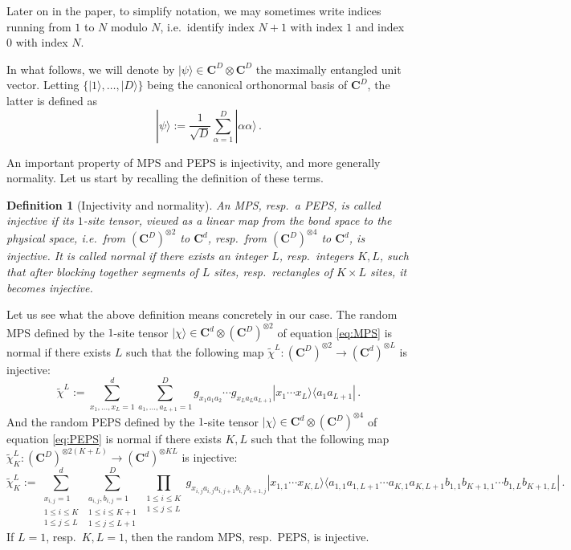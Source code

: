 \documentclass{amsart}
\newtheorem{definition}[theorem]{Definition}
\newcommand{\C}{\mathbf{C}}
\renewcommand{\leq}{\leqslant}
\newcommand{\ketbra}[2]{| #1 \rangle\!\langle #2 |}
\newcommand{\ket}[1]{| #1 \rangle}
\begin{document}
Later on in the paper, to simplify notation, we may sometimes write indices running from $1$ to $N$ modulo $N$, i.e.~identify index $N+1$ with index $1$ and index $0$ with index $N$.

In what follows, we will denote by $\ket{\psi}\in \C^D\otimes\C^D$ the maximally entangled unit vector. Letting $\{ \ket{1},\ldots,\ket{D} \}$ being the canonical orthonormal basis of $\C^D$, the latter is defined as
\[ \ket{\psi} := \frac{1}{\sqrt{D}}\sum_{\alpha=1}^{D} \ket{\alpha\alpha} \, . \]

An important property of MPS and PEPS is injectivity, and more generally normality. Let us start by recalling the definition of these terms.

\begin{definition}[Injectivity and normality]
    An MPS, resp.~a PEPS, is called injective if its $1$-site tensor, viewed as a linear map from the bond space to the physical space, i.e.~from $(\C^D)^{\otimes 2}$ to $\C^d$, resp.~from $(\C^D)^{\otimes 4}$ to $\C^d$, is injective. It is called normal if there exists an integer $L$, resp.~integers $K,L$, such that after blocking together segments of $L$ sites, resp.~rectangles of $K\times L$ sites, it becomes injective.
\end{definition}

Let us see what the above definition means concretely in our case. The random MPS defined by the $1$-site tensor $\ket{\chi}\in\C^d\otimes(\C^D)^{\otimes 2}$ of equation \eqref{eq:MPS} is normal if there exists $L$ such that the following map $\widetilde{\chi}^L:(\C^D)^{\otimes 2}\longrightarrow(\C^d)^{\otimes L}$ is injective:
\[ \widetilde{\chi}^L:= \sum_{x_1,\ldots,x_L=1}^d \sum_{a_1,\ldots,a_{L+1}=1}^D g_{x_1a_1a_2}\cdots g_{x_La_La_{L+1}}  \ketbra{x_1\cdots x_L}{a_1a_{L+1}} \, . \]
And the random PEPS defined by the $1$-site tensor $\ket{\chi}\in\C^d\otimes(\C^D)^{\otimes 4}$ of equation \eqref{eq:PEPS} is normal if there exists $K,L$ such that the following map $\widetilde{\chi}_K^L:(\C^D)^{\otimes 2(K+L)}\longrightarrow(\C^d)^{\otimes KL}$ is injective:
\[ \widetilde{\chi}_K^L:= \sum_{\substack{x_{i,j}=1 \\ 1\leq i\leq K \\ 1\leq j\leq L}}^d \sum_{\substack{a_{i,j},b_{i,j}=1 \\ 1\leq i\leq K+1 \\ 1\leq j\leq L+1}} ^D \prod_{\substack{1\leq i\leq K \\ 1\leq j\leq L}} g_{x_{i,j}a_{i,j}a_{i,j+1}b_{i,j}b_{i+1,j}}  \ketbra{x_{1,1}\cdots x_{K,L}}{a_{1,1}a_{1,L+1}\cdots a_{K,1}a_{K,L+1}b_{1,1}b_{K+1,1}\cdots b_{1,L}b_{K+1,L}} \, . \]
If $L=1$, resp.~$K,L=1$, then the random MPS, resp.~PEPS, is injective.
\end{document}
